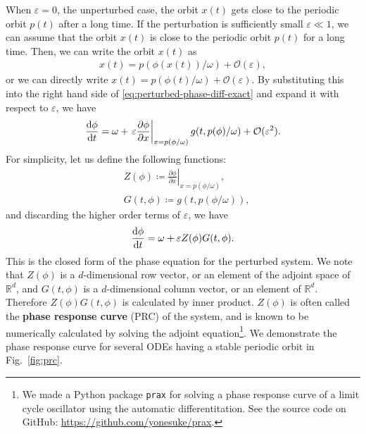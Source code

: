 When $\varepsilon=0$, the unperturbed case, the orbit $x(t)$ gets close to the periodic orbit $p(t)$ after a long time.
If the perturbation is sufficiently small $\varepsilon\ll1$, we can assume that the orbit $x(t)$ is close to the periodic orbit $p(t)$ for a long time.
Then, we can write the orbit $x(t)$ as
\begin{align}
  x(t)=p(\phi(x(t))/\omega) + \mathcal{O}(\varepsilon),
\end{align}
or we can directly write $x(t)=p(\phi(t)/\omega)+\mathcal{O}(\varepsilon)$.
By substituting this into the right hand side of \eqref{eq:perturbed-phase-diff-exact} and expand it with respect to $\varepsilon$, we have
\begin{align}
  \frac{\mathrm{d}\phi}{\mathrm{d} t}=\omega + \left.\varepsilon\frac{\partial\phi}{\partial x}\right|_{x=p(\phi/\omega)}g(t,p(\phi)/\omega) + \mathcal{O}(\varepsilon^{2}).
\end{align}
For simplicity, let us define the following functions:
\begin{align}
  &Z(\phi)\coloneqq\left.\frac{\partial\phi}{\partial x}\right|_{x=p(\phi/\omega)},\label{eq:prc}\\
  &G(t,\phi)\coloneqq g(t,p(\phi/\omega)),
\end{align}
and discarding the higher order terms of $\varepsilon$, we have
\begin{align}
  \frac{\mathrm{d}\phi}{\mathrm{d} t}=\omega + \varepsilon Z(\phi)G(t,\phi).
  \label{eq:perturbed-phase-diff}
\end{align}
This is the closed form of the phase equation for the perturbed system.
We note that $Z(\phi)$ is a $d$-dimensional row vector, or an element of the adjoint space of $\mathbb{R}^{d}$,
and $G(t, \phi)$ is a $d$-dimensional column vector, or an element of $\mathbb{R}^{d}$.
Therefore $Z(\phi)G(t,\phi)$ is calculated by inner product.
$Z(\phi)$ is often called the \textbf{phase response curve} (PRC) of the system,
and is known to be numerically calculated by solving the adjoint equation\footnote{We made a Python package \texttt{prax} for solving a phase response curve of a limit cycle oscillator using the automatic differentitation. See the source code on GitHub: \url{https://github.com/yonesuke/prax}.}.
We demonstrate the phase response curve for several ODEs having a stable periodic orbit in Fig.~\ref{fig:prc}.

